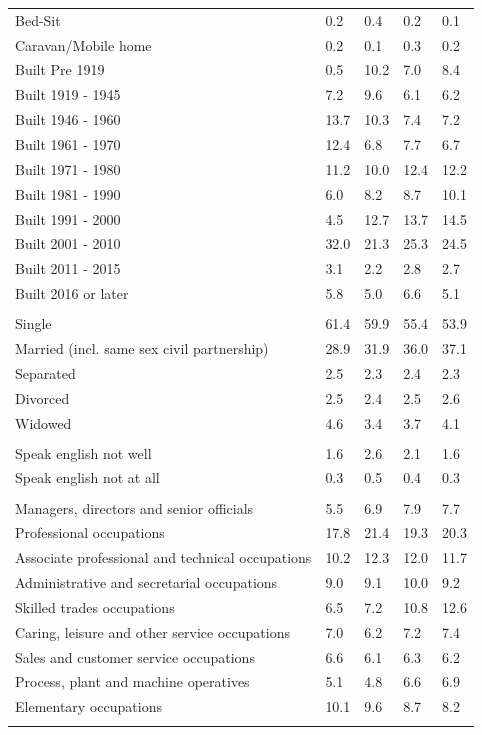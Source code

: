 \documentclass{article}
\begin{document}
\begin{table}[h]
\begin{tabular}{KTTTT}
Bed-Sit & 0.2& 0.4& 0.2& 0.1\\
Caravan/Mobile home & 0.2& 0.1& 0.3& 0.2\\
    \hline
Built Pre 1919 &  0.5& 10.2&  7.0&  8.4\\
Built 1919 - 1945 & 7.2& 9.6& 6.1& 6.2\\
Built  1946 - 1960 & 13.7& 10.3&  7.4&  7.2\\
Built  1961 - 1970 & 12.4&  6.8&  7.7&  6.7\\
Built  1971 - 1980 & 11.2& 10.0& 12.4& 12.2\\
Built  1981 - 1990 &  6.0&  8.2&  8.7& 10.1\\
Built  1991 - 2000 &  4.5& 12.7& 13.7& 14.5\\
Built  2001 - 2010 & 32.0& 21.3& 25.3& 24.5\\
Built  2011 - 2015 & 3.1& 2.2& 2.8& 2.7\\
Built  2016 or later & 5.8& 5.0& 6.6& 5.1\\
\hline
    \\
    \hline
Single & 61.4& 59.9& 55.4& 53.9\\
Married (incl. same sex civil partnership) & 28.9& 31.9& 36.0& 37.1\\
Separated  & 2.5& 2.3& 2.4& 2.3\\
Divorced  & 2.5& 2.4& 2.5& 2.6\\
Widowed & 4.6& 3.4& 3.7& 4.1\\
\hline
    \\ 
    \hline
Speak english not well & 1.6& 2.6& 2.1& 1.6\\
Speak english not at all & 0.3& 0.5& 0.4& 0.3\\
\hline
    \\
    \hline
Managers, directors and senior officials & 5.5& 6.9& 7.9& 7.7\\
Professional occupations & 17.8& 21.4& 19.3& 20.3\\
Associate professional and technical occupations & 10.2& 12.3& 12.0& 11.7\\
Administrative and secretarial occupations &  9.0&  9.1& 10.0&  9.2\\
Skilled trades occupations &  6.5&  7.2& 10.8& 12.6\\
Caring, leisure and other service occupations & 7.0& 6.2& 7.2& 7.4\\
Sales and customer service occupations & 6.6& 6.1& 6.3& 6.2\\
Process, plant and machine operatives & 5.1& 4.8& 6.6& 6.9\\
Elementary occupations & 10.1&  9.6&  8.7&  8.2\\
\hline
\end{tabular}
\end{table}
\end{document}

